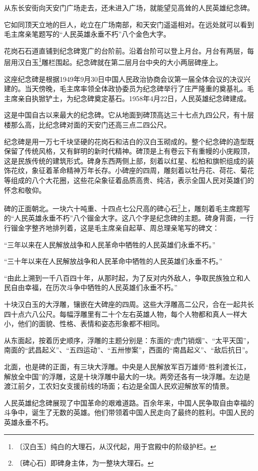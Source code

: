 \documentclass[12pt,UTF-8,openany]{ctexbook}
\begin{document}
\begin{normalsize}
    
    从东长安街向天安门广场走去，还未进入广场，就能望见高耸的人民英雄纪念碑。
    
    它如同顶天立地的巨人，屹立在广场南部，和天安门遥遥相对。在远处就可以看到毛主席亲笔题写的“人民英雄永垂不朽”八个金色大字。
    
    花岗石石道直铺到纪念碑宽广的台阶前。沿着台阶可以登上月台。月台有两层，每层用汉白玉\footnote{〔汉白玉〕纯白的大理石，从汉代起，用于宫殿中的阶级护栏。}雕栏围起。纪念碑就在第二层月台中央的大小两层碑座上。
    
    这座纪念碑是根据1949年9月30日中国人民政治协商会议第一届全体会议的决议兴建的。当天傍晚，毛主席率领全体政协委员为纪念碑举行了庄严隆重的奠基礼。毛主席亲自执锨铲土，为纪念碑奠定基石。1958年4月22日，人民英雄纪念碑建成。
    
    这是中国自古以来最大的纪念碑。它从地面到碑顶高达三十七点九四公尺，有十层楼那么高，比纪念碑对面的天安门还高三点二四公尺。
    
    纪念碑是用一万七千块坚硬的花岗石和洁白的汉白玉砌成的。整个纪念碑的造型既保留了传统风格，又有鲜明的新时代精神。碑顶是上有卷云下有重幔的小庑殿顶，这是民族传统的建筑形式。碑身东西两侧上部，刻着以红星、松柏和旗帜组成的装饰花纹，象征着革命精神万年长存。小碑座的四周，雕刻着以牡丹花、荷花、菊花等组成的八个大花圈，这些花朵象征着品质高贵、纯洁，表示全国人民对英雄们的怀念和敬仰。
    
    碑的正面朝北。一块六十吨重、十四点七公尺高的碑心石\footnote{〔碑心石〕即碑身主体，为一整块大理石。}上，雕刻着毛主席题写的“人民英雄永垂不朽”八个镏金大字。这八个字是纪念碑的主题。碑身背面，一行行镏金字整齐地排列着，这是毛主席亲自起草、周总理亲笔写的碑文：
    
    “三年以来在人民解放战争和人民革命中牺牲的人民英雄们永垂不朽。”
    
    “三十年以来在人民解放战争和人民革命中牺牲的人民英雄们永垂不朽。”
    
    “由此上溯到一千八百四十年，从那时起，为了反对内外敌人，争取民族独立和人民自由幸福，在历次斗争中牺牲的人民英雄们永垂不朽。”
    
    十块汉白玉的大浮雕，镶嵌在大碑座的四周。这些大浮雕高二公尺，合在一起共长四十点六八公尺。每幅浮雕里有二十个左右英雄人物，每个人物都和真人一样大小，他们的面貌、性格、表情和姿态形象都不相同。
    
    从东面起，按着历史顺序，浮雕的主题分别是：东面的“虎门销烟”、“太平天国”，南面的“武昌起义”、“五四运动”、“五卅惨案”，西面的“南昌起义”、“敌后抗日”。
    
    北面，也是碑的正面，有三块大浮雕。中央是人民解放军百万雄师“胜利渡长江，解放全中国”的浮雕，这是十块浮雕中最大的一块。两旁还各有一块浮雕。左边是渡江前夕，工农妇女支援前线的场面；右边是全国人民欢迎解放军的情景。
    
    人民英雄纪念碑展现了中国革命的艰难道路。百余年来，中国人民争取自由幸福的斗争中，诞生了无数的英雄。他们带领着中国人民走向了最终的胜利。中国人民的英雄永垂不朽。
    
\end{normalsize}
\end{document}
